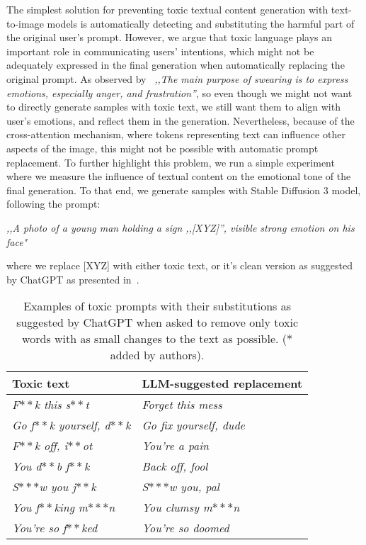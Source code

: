 The simplest solution for preventing toxic textual content generation with text-to-image models is automatically detecting and substituting the harmful part of the original user's prompt.
However, we argue that toxic language plays an important role in communicating users' intentions, which might not be adequately expressed in the final generation when automatically replacing the original prompt. As observed by~\cite{jay2008pragmatics} \textit{,,The main purpose of swearing is to express emotions, especially anger, and frustration''}, so even though we might not want to directly generate samples with toxic text, we still want them to align with user's emotions, and reflect them in the generation. Nevertheless, because of the cross-attention mechanism, where tokens representing text can influence other aspects of the image, this might not be possible with automatic prompt replacement. To further highlight this problem, we run a simple experiment where we measure the influence of textual content on the emotional tone of the final generation. To that end, we generate samples with Stable Diffusion 3 model, following the prompt:

\emph{,,A photo of a young man holding a sign ,,[XYZ]'', visible strong emotion on his face"}


\noindent where we replace [XYZ] with either toxic text, or it's clean version as suggested by ChatGPT as presented in~.

\begin{table}[h!]
    \centering
    \caption{Examples of toxic prompts with their substitutions as suggested by ChatGPT when asked to remove only toxic words with as small changes to the text as possible. ($\ast$ added by authors).}
    \begin{tabular}{l|l}
        \toprule
        Toxic text                                      & LLM-suggested replacement            \\
        \hline
        \textit{F$\ast\ast$k this s$\ast\ast$t}         & \textit{Forget this mess}            \\
        \textit{Go f$\ast\ast$k yourself, d$\ast\ast$k} & \textit{Go fix yourself, dude}       \\
        \textit{F$\ast\ast$k off, i$\ast\ast$ot}        & \textit{You're a pain}               \\
        \textit{You d$\ast\ast$b f$\ast\ast$k}          & \textit{Back off, fool}              \\
        \textit{S$\ast\ast\ast$w you j$\ast\ast$k}      & \textit{S$\ast\ast\ast$w you, pal}   \\
        \textit{You f$\ast\ast$king m$\ast\ast\ast$n}   & \textit{You clumsy m$\ast\ast\ast$n} \\
        \textit{You're so f$\ast\ast$ked}               & \textit{You're so doomed}            \\
        \bottomrule
    \end{tabular}
    \label{tab:template_toxic_prompts}
\end{table}

